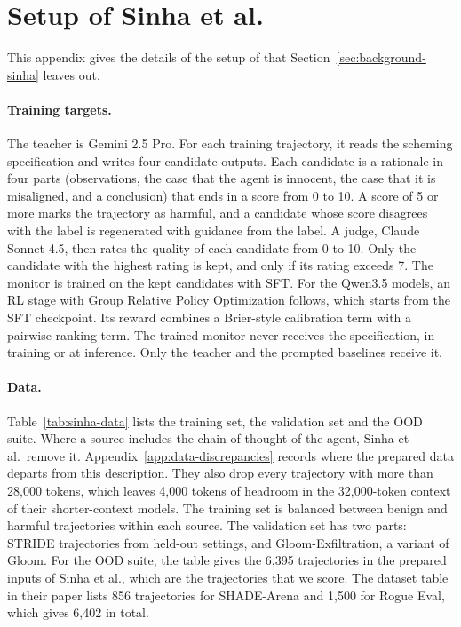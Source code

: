 \section{Setup of Sinha et al.}
\label{app:sinha-setup}

This appendix gives the details of the setup of \citet{sinha2026training} that Section~\ref{sec:background-sinha} leaves out.

\paragraph{Training targets.}
The teacher is Gemini 2.5 Pro.
For each training trajectory, it reads the scheming specification and writes four candidate outputs.
Each candidate is a rationale in four parts (observations, the case that the agent is innocent, the case that it is misaligned, and a conclusion) that ends in a score from 0 to 10.
A score of 5 or more marks the trajectory as harmful, and a candidate whose score disagrees with the label is regenerated with guidance from the label.
A judge, Claude Sonnet 4.5, then rates the quality of each candidate from 0 to 10.
Only the candidate with the highest rating is kept, and only if its rating exceeds 7.
The monitor is trained on the kept candidates with SFT.
For the Qwen3.5 models, an RL stage with Group Relative Policy Optimization follows, which starts from the SFT checkpoint.
Its reward combines a Brier-style calibration term with a pairwise ranking term.
The trained monitor never receives the specification, in training or at inference.
Only the teacher and the prompted baselines receive it.

\paragraph{Data.}
Table~\ref{tab:sinha-data} lists the training set, the validation set and the OOD suite.
Where a source includes the chain of thought of the agent, Sinha et al.\ remove it.
Appendix~\ref{app:data-discrepancies} records where the prepared data departs from this description.
They also drop every trajectory with more than 28,000 tokens, which leaves 4,000 tokens of headroom in the 32,000-token context of their shorter-context models.
The training set is balanced between benign and harmful trajectories within each source.
The validation set has two parts: STRIDE trajectories from held-out settings, and Gloom-Exfiltration, a variant of Gloom.
For the OOD suite, the table gives the 6,395 trajectories in the prepared inputs of Sinha et al., which are the trajectories that we score.
The dataset table in their paper lists 856 trajectories for SHADE-Arena and 1,500 for Rogue Eval, which gives 6,402 in total.

